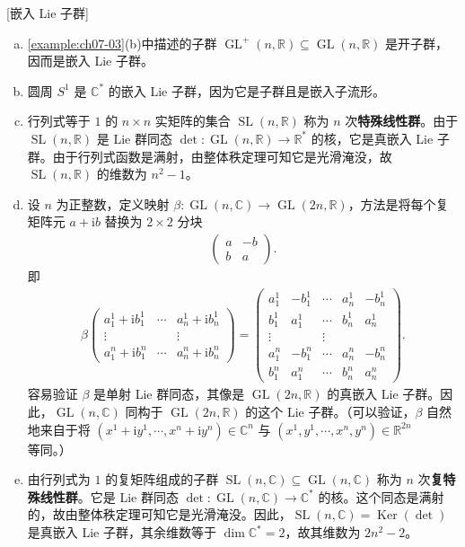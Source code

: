 \documentclass[../../main.tex]{subfiles}
\begin{document}
\begin{example}\label{example:ch07-18}[嵌入 Lie 子群]
\begin{enumerate}[(a)]
\item \cref{example:ch07-03}(b)中描述的子群 $\operatorname{GL}^{+}(n,\mathbb{R})\subseteq\operatorname{GL}(n,\mathbb{R})$ 是开子群，因而是嵌入 Lie 子群。

\item 圆周 $S^1$ 是 $\mathbb{C}^*$ 的嵌入 Lie 子群，因为它是子群且是嵌入子流形。

\item 行列式等于 $1$ 的 $n\times n$ 实矩阵的集合 $\operatorname{SL}(n,\mathbb{R})$ 称为 $n$ 次\textbf{特殊线性群}。由于 $\operatorname{SL}(n,\mathbb{R})$ 是 Lie 群同态 $\det\colon\operatorname{GL}(n,\mathbb{R})\to\mathbb{R}^*$ 的核，它是真嵌入 Lie 子群。由于行列式函数是满射，由整体秩定理可知它是光滑淹没，故 $\operatorname{SL}(n,\mathbb{R})$ 的维数为 $n^2-1$。

\item 设 $n$ 为正整数，定义映射 $\beta\colon\operatorname{GL}(n,\mathbb{C})\to\operatorname{GL}(2n,\mathbb{R})$，方法是将每个复矩阵元 $a+\mathrm{i}b$ 替换为 $2\times2$ 分块
\begin{align*}
\begin{pmatrix}a&-b\\ b&a\end{pmatrix}.
\end{align*}
即
\begin{align*}
\beta\begin{pmatrix}
a_1^1+\mathrm{i}b_1^1&\cdots&a_n^1+\mathrm{i}b_n^1\\
\vdots&&\vdots\\
a_1^n+\mathrm{i}b_1^n&\cdots&a_n^n+\mathrm{i}b_n^n
\end{pmatrix}
=
\begin{pmatrix}
a_1^1&-b_1^1&\cdots&a_n^1&-b_n^1\\
b_1^1&a_1^1&\cdots&b_n^1&a_n^1\\
\vdots&&\vdots\\
a_1^n&-b_1^n&\cdots&a_n^n&-b_n^n\\
b_1^n&a_1^n&\cdots&b_n^n&a_n^n
\end{pmatrix}.
\end{align*}
容易验证 $\beta$ 是单射 Lie 群同态，其像是 $\operatorname{GL}(2n,\mathbb{R})$ 的真嵌入 Lie 子群。因此，$\operatorname{GL}(n,\mathbb{C})$ 同构于 $\operatorname{GL}(2n,\mathbb{R})$ 的这个 Lie 子群。（可以验证，$\beta$ 自然地来自于将 $(x^1+\mathrm{i}y^1,\cdots ,x^n+\mathrm{i}y^n)\in\mathbb{C}^n$ 与 $(x^1,y^1,\cdots ,x^n,y^n)\in\mathbb{R}^{2n}$ 等同。）

\item 由行列式为 $1$ 的复矩阵组成的子群 $\operatorname{SL}(n,\mathbb{C})\subseteq\operatorname{GL}(n,\mathbb{C})$ 称为 $n$ 次\textbf{复特殊线性群}。它是 Lie 群同态 $\det\colon\operatorname{GL}(n,\mathbb{C})\to\mathbb{C}^*$ 的核。这个同态是满射的，故由整体秩定理可知它是光滑淹没。因此，$\operatorname{SL}(n,\mathbb{C})=\operatorname{Ker}(\det)$ 是真嵌入 Lie 子群，其余维数等于 $\dim\mathbb{C}^*=2$，故其维数为 $2n^2-2$。
\end{enumerate}
\end{example}
\end{document}
